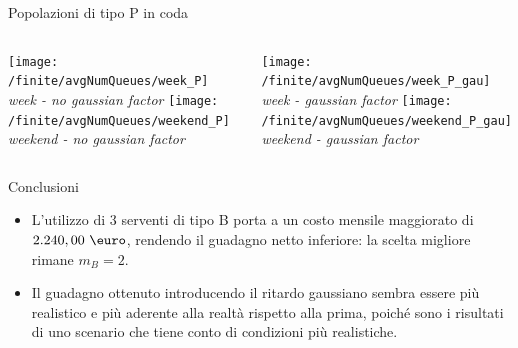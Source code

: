 \documentclass[xcolor=table]{beamer}
\begin{document}
\begin{frame}{Popolazioni di tipo P in coda}
\begin{columns}
\centering
\texttt{[image: /finite/avgNumQueues/week\_P]}\\
\textit{week - no gaussian factor}
\texttt{[image: /finite/avgNumQueues/weekend\_P]}\\
\textit{weekend - no gaussian factor}

\centering
\texttt{[image: /finite/avgNumQueues/week\_P\_gau]}\\
\textit{week - gaussian factor}
\texttt{[image: /finite/avgNumQueues/weekend\_P\_gau]}\\
\textit{weekend - gaussian factor}
\end{columns}
\end{frame}



\begin{frame}{Conclusioni}\justifying
\begin{itemize}
\item L'utilizzo di 3 serventi di tipo B porta a un costo mensile maggiorato di $2.240,00\ \mbox{\euro}$, rendendo il guadagno netto inferiore: la scelta migliore rimane $m_B = 2$.

\item Il guadagno ottenuto introducendo il ritardo gaussiano sembra essere più realistico e più aderente alla realtà rispetto alla prima, poiché sono i risultati di uno scenario che tiene conto di condizioni più realistiche.
\end{itemize}

\end{frame}
\end{document}
